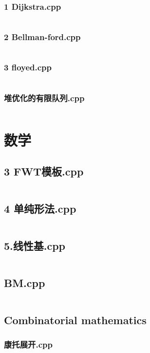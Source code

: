 \documentclass[a4paper,11pt]{article}
\begin{document}
\subsubsection{1 Dijkstra.cpp}
\inputminted{c++}{"D:/tmplz/templates/图论/最短路/1 Dijkstra.cpp"}
\subsubsection{2 Bellman-ford.cpp}
\inputminted{c++}{"D:/tmplz/templates/图论/最短路/2 Bellman-ford.cpp"}
\subsubsection{3 floyed.cpp}
\inputminted{c++}{"D:/tmplz/templates/图论/最短路/3 floyed.cpp"}
\subsubsection{堆优化的有限队列.cpp}
\inputminted{c++}{"D:/tmplz/templates/图论/最短路/堆优化的有限队列.cpp"}
\section{数学}
\subsection{3 FWT模板.cpp}
\inputminted{c++}{"D:/tmplz/templates/数学/3 FWT模板.cpp"}
\subsection{4 单纯形法.cpp}
\inputminted{c++}{"D:/tmplz/templates/数学/4 单纯形法.cpp"}
\subsection{5.线性基.cpp}
\inputminted{c++}{"D:/tmplz/templates/数学/5.线性基.cpp"}
\subsection{BM.cpp}
\inputminted{c++}{"D:/tmplz/templates/数学/BM.cpp"}
\subsection{Combinatorial mathematics}
\subsubsection{康托展开.cpp}
\inputminted{c++}{"D:/tmplz/templates/数学/Combinatorial mathematics/康托展开.cpp"}
\end{document}
